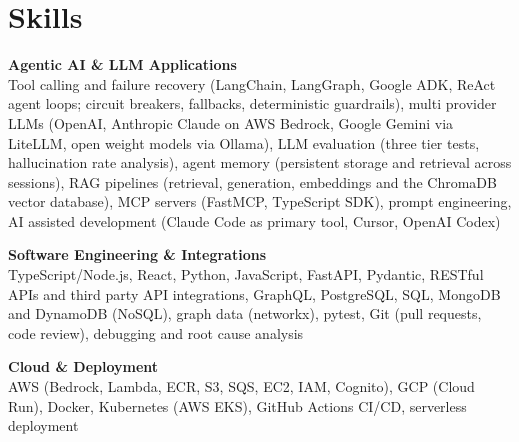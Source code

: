 \documentclass[a4paper,11pt]{article}
\newcommand{\skillgroup}[2]{{\color{headernavy}\textbf{#1}}\\ #2\par\vspace{3pt}}
\begin{document}
\section{Skills}
\skillgroup{Agentic AI \& LLM Applications}{Tool calling and failure recovery (LangChain, LangGraph, Google ADK, ReAct agent loops; circuit breakers, fallbacks, deterministic guardrails), multi provider LLMs (OpenAI, Anthropic Claude on AWS Bedrock, Google Gemini via LiteLLM, open weight models via Ollama), LLM evaluation (three tier tests, hallucination rate analysis), agent memory (persistent storage and retrieval across sessions), RAG pipelines (retrieval, generation, embeddings and the ChromaDB vector database), MCP servers (FastMCP, TypeScript SDK), prompt engineering, AI assisted development (Claude Code as primary tool, Cursor, OpenAI Codex)}
\skillgroup{Software Engineering \& Integrations}{TypeScript/Node.js, React, Python, JavaScript, FastAPI, Pydantic, RESTful APIs and third party API integrations, GraphQL, PostgreSQL, SQL, MongoDB and DynamoDB (NoSQL), graph data (networkx), pytest, Git (pull requests, code review), debugging and root cause analysis}
\skillgroup{Cloud \& Deployment}{AWS (Bedrock, Lambda, ECR, S3, SQS, EC2, IAM, Cognito), GCP (Cloud Run), Docker, Kubernetes (AWS EKS), GitHub Actions CI/CD, serverless deployment}
\end{document}
